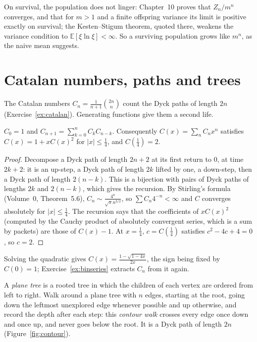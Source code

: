 \begin{remark}
On survival, the population does not linger: Chapter~10 proves that $Z_n/m^n$ converges, and that for $m>1$ and a
finite offspring variance its limit is positive exactly on survival; the Kesten--Stigum theorem, quoted there, weakens the
variance condition to $\mathbb E[\xi\ln\xi]<\infty$. So a surviving population grows like $m^n$, as the naive mean suggests.
\end{remark}

\section{Catalan numbers, paths and trees}

The Catalan numbers $C_n=\frac1{n+1}\binom{2n}n$ count the Dyck paths of length $2n$ (Exercise~\ref{ex:catalan}). Generating
functions give them a second life.

\begin{proposition}\label{prop:catalanrec}
$C_0=1$ and $C_{n+1}=\sum_{k=0}^nC_kC_{n-k}$. Consequently $C(x)=\sum_nC_nx^n$ satisfies $C(x)=1+xC(x)^2$ for
$|x|\le\frac14$, and $C(\frac14)=2$.
\end{proposition}
\begin{proof}
Decompose a Dyck path of length $2n+2$ at its first return to $0$, at time $2k+2$: it is an up-step, a Dyck path of length
$2k$ lifted by one, a down-step, then a Dyck path of length $2(n-k)$. This is a bijection with pairs of Dyck paths of
lengths $2k$ and $2(n-k)$, which gives the recursion. By Stirling's formula (Volume~0, Theorem~5.6),
$C_n\sim\frac{4^n}{\sqrt\pi n^{3/2}}$, so $\sum C_n4^{-n}<\infty$ and $C$ converges absolutely for $|x|\le\frac14$. The recursion says that the
coefficients of $xC(x)^2$ (computed by the Cauchy product of absolutely convergent series, which is a sum by packets)
are those of $C(x)-1$. At $x=\frac14$, $c=C(\frac14)$ satisfies $c^2-4c+4=0$, so $c=2$.
\end{proof}

Solving the quadratic gives $C(x)=\frac{1-\sqrt{1-4x}}{2x}$, the sign being fixed by $C(0)=1$; Exercise~\ref{ex:binseries}
extracts $C_n$ from it again.

A \emph{plane tree} is a rooted tree in which the children of each vertex are ordered from left to right. Walk around
a plane tree with $n$ edges, starting at the root, going down the leftmost unexplored edge whenever possible and up
otherwise, and record the depth after each step: this \emph{contour walk} crosses every edge once down and once up,
and never goes below the root. It is a Dyck path of length $2n$ (Figure~\ref{fig:contour}).

